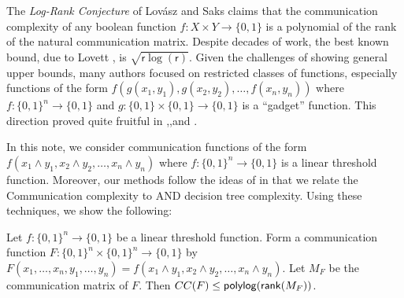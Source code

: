 The \textit{Log-Rank Conjecture} of Lov\'{a}sz and Saks \cite{Lovasz1988} claims that the communication complexity of any boolean function $f: X\times Y \to \{0,1\}$ is a polynomial of the rank of the natural communication matrix. Despite decades of work, the best known bound, due to Lovett \cite{Lovett2013}, is $\sqrt{\mathsf{r}\log(\mathsf{r})}$. Given the challenges of showing general upper bounds, many authors focused on restricted classes of functions, especially functions of the form $f(g(x_1,y_1),g(x_2,y_2),\dots,f(x_n,y_n))$ where $f : \{0,1\}^n \to \{0,1\}$ and $g : \{0,1\}\times\{0,1\}\to\{0,1\}$ is a ``gadget'' function. This direction proved quite fruitful in \cite{Goos2015},\cite{Tsang2013},and \cite{Lovett2016}. 

In this note, we consider communication functions of the form $f(x_1 \wedge y_1,x_2\wedge y_2,\dots,x_n\wedge y_n)$ where $f : \{0,1\}^n\to\{0,1\}$ is a linear threshold function. Moreover, our methods follow the ideas of \cite{Lovett2016} in that we relate the Communication complexity to AND decision tree complexity.  Using these techniques, we show the following:
\begin{theorem}\label{mainresult}
	Let $f : \{0,1\}^n\to\{0,1\}$ be a linear threshold function. Form a communication function $F: \{0,1\}^n\times \{0,1\}^n\to\{0,1\}$ by $F(x_1,\dots,x_n,y_1,\dots,y_n)  = f(x_1 \wedge y_1,x_2\wedge y_2,\dots,x_n\wedge y_n)$. Let  $M_F$ be the communication matrix of $F$. Then $CC(F) \leq \mathsf{polylog}(\mathsf{rank}(M_F))$. 
\end{theorem}